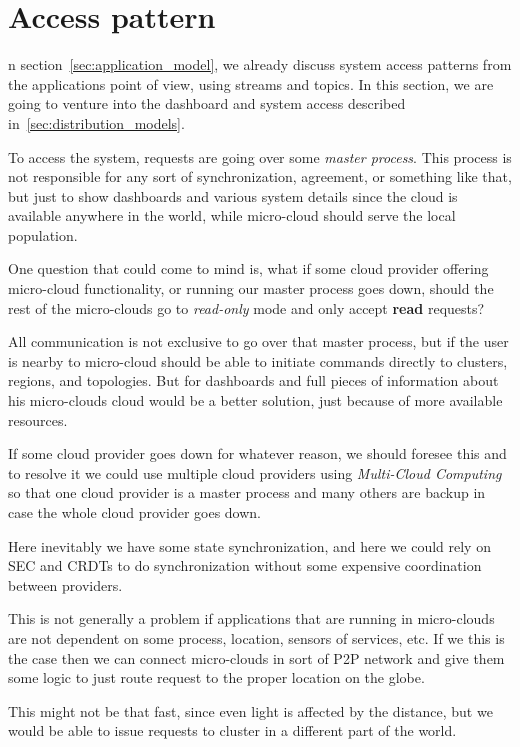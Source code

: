 \section{Access pattern}\label{sec:access_pattern}
%
n section~\ref{sec:application_model}, we already discuss system access patterns from the applications point of view, using streams and topics. In this section, we are going to venture into the dashboard and system access described in~\ref{sec:distribution_models}. 

To access the system, requests are going over some \textit{master process}. This process is not responsible for any sort of synchronization, agreement, or something like that, but just to show dashboards and various system details since the cloud is available anywhere in the world, while micro-cloud should serve the local population. 

One question that could come to mind is, what if some cloud provider offering micro-cloud functionality, or running our master process goes down, should the rest of the micro-clouds go to \textit{read-only} mode and only accept \textbf{read} requests?

All communication is not exclusive to go over that master process, but if the user is nearby to micro-cloud should be able to initiate commands directly to clusters, regions, and topologies. But for dashboards and full pieces of information about his micro-clouds cloud would be a better solution, just because of more available resources.

If some cloud provider goes down for whatever reason, we should foresee this and to resolve it we could use multiple cloud providers using \textit{Multi-Cloud Computing}~\cite{HongDSH19, Ardagna15} so that one cloud provider is a master process and many others are backup in case the whole cloud provider goes down.

Here inevitably we have some state synchronization, and here we could rely on SEC and CRDTs to do synchronization without some expensive coordination between providers.

This is not generally a problem if applications that are running in micro-clouds are not dependent on some process, location, sensors of services, etc. If we this is the case then we can connect micro-clouds in sort of P2P network and give them some logic to just route request to the proper location on the globe. 

This might not be that fast, since even light is affected by the distance, but we would be able to issue requests to cluster in a different part of the world.
%
%
